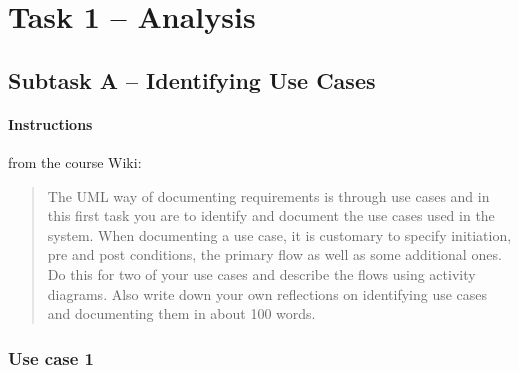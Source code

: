 %
%
%
%


\section{Task 1 -- Analysis}

\subsection{Subtask A -- Identifying Use Cases}\label{task-1a}
\paragraph{Instructions}\label{task-1a-instructions}
from the course Wiki\cite{1dv600:lab2:instructions}:

\begin{quote}
  The UML way of documenting requirements is through use cases and in this
  first task you are to identify and document the use cases used in the system.
  When documenting a use case, it is customary to specify initiation, pre and
  post conditions, the primary flow as well as some additional ones.  Do this
  for two of your use cases and describe the flows using activity diagrams.
  Also write down your own reflections on identifying use cases and documenting
  them in about 100 words.
\end{quote}


\subsubsection{Use case 1}\label{task-1a-usecase1}
%

